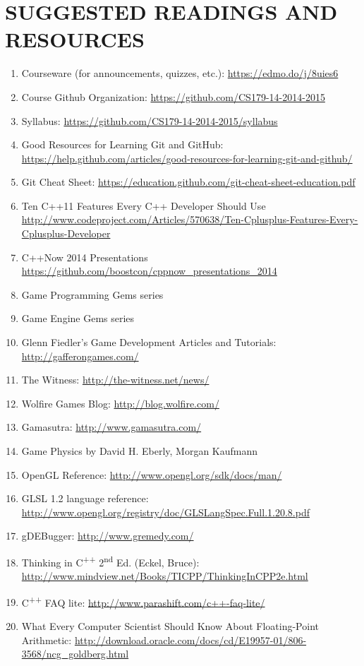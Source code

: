 \documentclass[10pt]{article}
\begin{document}
\section{SUGGESTED READINGS AND RESOURCES}
\begin{enumerate}[noitemsep]
\item Courseware (for announcements, quizzes, etc.): \url{https://edmo.do/j/8uies6}
\item Course Github Organization: \url{https://github.com/CS179-14-2014-2015}
\item Syllabus: \url{https://github.com/CS179-14-2014-2015/syllabus}
\item Good Resources for Learning Git and GitHub: \url{https://help.github.com/articles/good-resources-for-learning-git-and-github/}
\item Git Cheat Sheet: \url{https://education.github.com/git-cheat-sheet-education.pdf}
\item Ten C++11 Features Every C++ Developer Should Use \url{http://www.codeproject.com/Articles/570638/Ten-Cplusplus-Features-Every-Cplusplus-Developer}
\item C++Now 2014 Presentations \url{https://github.com/boostcon/cppnow_presentations_2014}
\item Game Programming Gems series
\item Game Engine Gems series
\item Glenn Fiedler's Game Development Articles and Tutorials: \url{http://gafferongames.com/}
\item The Witness: \url{http://the-witness.net/news/}
\item Wolfire Games Blog: \url{http://blog.wolfire.com/}
\item Gamasutra: \url{http://www.gamasutra.com/}
\item Game Physics by David H. Eberly, Morgan Kaufmann
\item OpenGL Reference: \url{http://www.opengl.org/sdk/docs/man/}
\item GLSL 1.2 language reference: \url{http://www.opengl.org/registry/doc/GLSLangSpec.Full.1.20.8.pdf}
\item gDEBugger: \url{http://www.gremedy.com/}
\item Thinking in C\textsuperscript{++} 2\textsuperscript{nd} Ed. (Eckel, Bruce): \\\url{http://www.mindview.net/Books/TICPP/ThinkingInCPP2e.html}
\item C\textsuperscript{++} FAQ lite: \url{http://www.parashift.com/c++-faq-lite/}
\item What Every Computer Scientist Should Know About Floating-Point Arithmetic: \url{http://download.oracle.com/docs/cd/E19957-01/806-3568/ncg_goldberg.html}
\end{enumerate}
\end{document}
